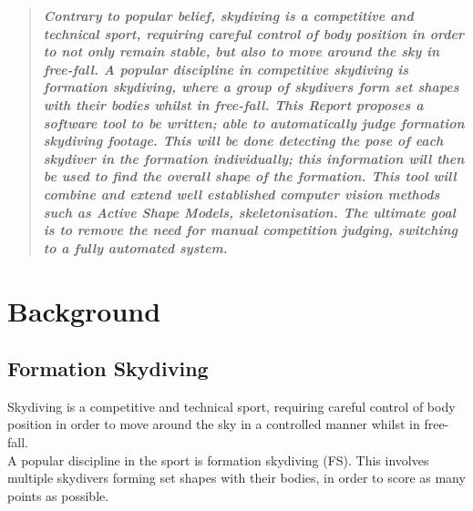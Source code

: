 \documentclass[a4paper, 12pt]{article}
\begin{document}
\thispagestyle{empty}
\setcounter{page}{0}
\begin{abstract}\textbf{\emph{
Contrary to popular belief, skydiving is a competitive and technical sport, requiring careful control of body position in order to not only remain stable, but also to move around the sky in free-fall. A popular discipline in competitive skydiving is formation skydiving, where a group of skydivers form set shapes with their bodies whilst in free-fall. This Report proposes a software tool to be written; able to automatically judge  formation skydiving footage. This will be done detecting the pose of each skydiver in the formation individually; this information will then be used to find the overall shape of the formation. This tool will combine and extend well established computer vision methods such as Active Shape Models, skeletonisation. The ultimate goal is to remove the need for manual competition judging, switching to a fully automated system.
}}\end{abstract}
\clearpage
%
\section{Background}
	\subsection{Formation Skydiving}
Skydiving is a competitive and technical sport, requiring careful control of body position in order to move around the sky in a controlled manner whilst in free-fall.\\
A popular discipline in the sport is formation skydiving (FS). This involves multiple skydivers forming set shapes with their bodies, in order to score as many points as possible.
\end{document}
